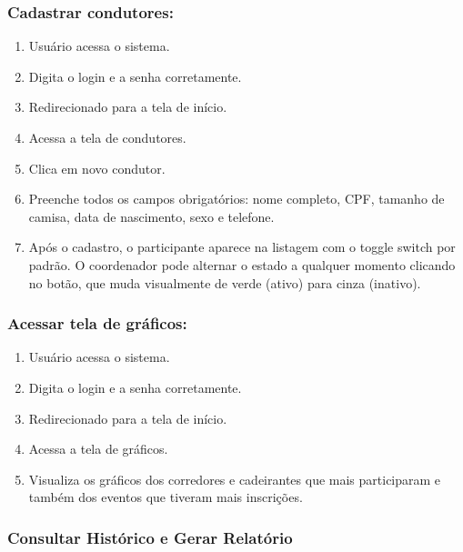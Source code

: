 \documentclass[12pt,a4paper]{article}
\begin{document}
\subsubsection{Cadastrar condutores:}
\begin{enumerate}
    \item Usuário acessa o sistema.
    \item Digita o login e a senha corretamente.
    \item Redirecionado para a tela de início.
    \item Acessa a tela de condutores.
    \item Clica em novo condutor.
    \item Preenche todos os campos obrigatórios: nome completo, CPF, tamanho de camisa, data de nascimento, sexo e telefone.
    \item Após o cadastro, o participante aparece na listagem com o toggle switch  por padrão. O coordenador pode alternar o estado a qualquer momento clicando no botão, que muda visualmente de verde (ativo) para cinza (inativo).
\end{enumerate}

\subsubsection{Acessar tela de gráficos:}
\begin{enumerate}
    \item Usuário acessa o sistema.
    \item Digita o login e a senha corretamente.
    \item Redirecionado para a tela de início.
    \item Acessa a tela de gráficos.
    \item Visualiza os gráficos dos corredores e cadeirantes que mais participaram e também dos eventos que tiveram mais inscrições. 
\end{enumerate}

\subsubsection{Consultar Histórico e Gerar Relatório}
\end{document}
